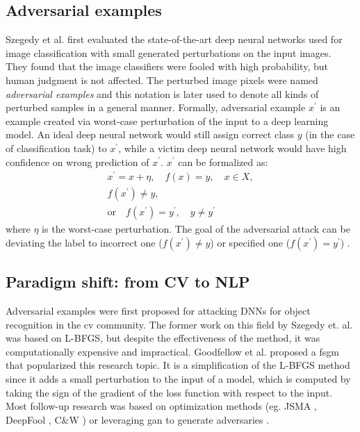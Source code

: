 \subsection{Adversarial examples}\label{subsec:adversarial-attacks}

Szegedy et al. \cite{szegedy2013intriguing} first evaluated the state-of-the-art deep neural networks used for image classification with small generated perturbations on the input images.
They found that the image classifiers were fooled with high probability, but human judgment is not affected. The perturbed image pixels were named \emph{adversarial examples} and this notation is later used to denote all kinds of perturbed samples in a general manner.
Formally, adversarial example $x^\prime$ is an example created via worst-case perturbation of the input to a deep learning model. An ideal deep neural network would still assign correct class $y$ (in the case of classification task) to $x^\prime$, 
while a victim deep neural network would have high confidence on wrong prediction of $x^\prime$. $x^\prime$ can be formalized as:
\begin{equation}
    \begin{array}{l}
    x^\prime = x + \eta, \quad f(x)=y, \quad x \in X,\\
    f(x^\prime) \neq y, \\
    \text{or} \quad f(x^\prime) = y^\prime, \quad y \neq y^\prime
    \end{array}
\end{equation}
where $\eta$ is the worst-case perturbation. The goal of the adversarial attack can be deviating the label to incorrect one ($f(x^\prime) \neq y$) or specified one ($f(x^\prime) = y^\prime$) \cite{journals/tist/ZhangSAL20}.

\subsection[Paradigm shift]{Paradigm shift: from CV to NLP}\label{subsec:paradigm-shift}
Adversarial examples were first proposed for attacking DNNs for object recognition in the \acrfull{cv} community.
The former work on this field by Szegedy et. al. \cite{szegedy2013intriguing}  was based on L-BFGS, but despite the effectiveness of the method, it was computationally expensive and impractical.
Goodfellow et al. \cite{goodfellow2014explaining} proposed a \acrfull{fsgm} that popularized this research topic. It is a simplification of the L-BFGS method since it adds a small perturbation to the input of a model, which is computed by taking the sign of the gradient of the loss function with respect to the input.
Most follow-up research was based on optimization methods (eg. JSMA \cite{journals/corr/PapernotMJFCS15}, DeepFool \cite{journals/corr/Moosavi-Dezfooli15}, C\&W \cite{journals/corr/CarliniW16a}) or leveraging \acrfull{gan} to generate adversaries \cite{journals/corr/abs-1710-11342}.

